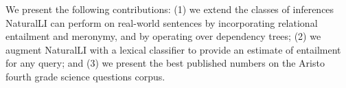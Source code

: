 

We present the following contributions:
(1) we extend the classes of inferences NaturalLI can perform on real-world sentences by
  incorporating relational entailment and meronymy, and by operating over dependency trees;
(2) we augment NaturalLI with a lexical classifier to provide an estimate of entailment
  for any query;
and 
(3) we present the best
    published numbers on the Aristo fourth grade science questions corpus.


